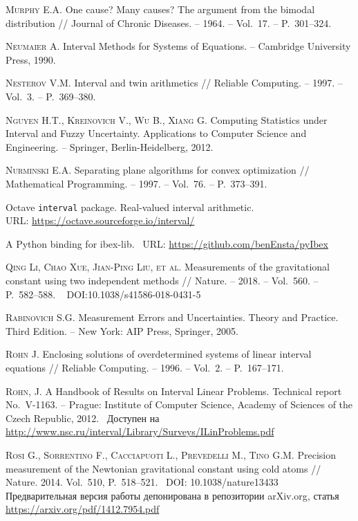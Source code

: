 \documentclass[a5paper,openany]{book}
\newcommand{\electronicbook}{}%
\newcommand{\doi}[1]{
    \ifdefined\electronicbook
        DOI:#1
    \fi}%
\begin{document}
\begin{thebibliography}{999}
\textsc{Murphy E.A.} One cause? Many causes? The argument from the bimodal distribution // 
Journal of Chronic Diseases. -- 1964. -- Vol.~17. -- P.~301--324. 
  
\textsc{Neumaier A.} Interval Methods for Systems of Equations. -- Cambridge 
University Press, 1990. 
  
\textsc{Nesterov V.M.} Interval and twin arithmetics // Reliable Computing. -- 1997. 
-- Vol.~3. -- P.~369--380. 
  
\textsc{Nguyen H.T., Kreinovich V., Wu B., Xiang G.} Computing Statistics 
under Interval and Fuzzy Uncertainty. Applications to Computer Science and Engineering. 
-- Springer, Berlin-Heidelberg, 2012. 
  
\textsc{Nurminski E.A.} Separating plane algorithms for convex optimization // 
Mathematical Programming. -- 1997. -- Vol.~76. -- P.~373–391. 
    
Octave \texttt{interval} package. Real-valued interval arithmetic. \\ 
URL: \url{https://octave.sourceforge.io/interval/} 
  
A Python binding for ibex-lib. \   URL: \url{https://github.com/benEnsta/pyIbex}
      
\textsc{Qing Li, Chao Xue, Jian-Ping Liu, et al.} Measurements of the gravitational 
constant using two independent methods // Nature. -- 2018. -- Vol.~560. -- P.~582--588. \  
\doi{10.1038/s41586-018-0431-5} 
  
\textsc{Rabinovich S.G.} Measurement Errors and Uncertainties. Theory and Practice.
Third Edition. -- New York: AIP Press, Springer, 2005. 
  
\textsc{Rohn J.} Enclosing solutions of overdetermined systems of linear interval 
equations // Reliable Computing. -- 1996. -- Vol.~2. -- P.~167--171. 
  
\textsc{Rohn, J.} A Handbook of Results on Interval Linear Problems. Technical report 
No.~V-1163. -- Prague: Institute of Computer Science, Academy of Sciences of the Czech 
Republic, 2012.   \  Доступен на  
\url{http://www.nsc.ru/interval/Library/Surveys/ILinProblems.pdf} 
  
\textsc{Rosi G., Sorrentino F., Cacciapuoti L., Prevedelli M., Tino G.M.} 
Precision measurement of the Newtonian gravitational constant using cold atoms //  
Nature. 2014. Vol.~510, P.~518--521. \  DOI: 10.1038/nature13433  \\   
Предварительная версия работы депонирована в репозитории arXiv.org, статья 
\url{https://arxiv.org/pdf/1412.7954.pdf}


\end{thebibliography}
\end{document}
